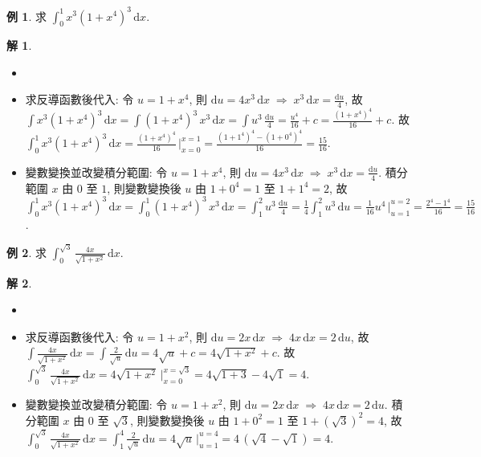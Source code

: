 \documentclass[12pt,a4paper]{extarticle}
\newcommand{\ds}{\displaystyle}
\newcommand{\ie}{\;\Longrightarrow\;}
\theoremstyle{definition}
\newtheorem*{ex}{例}
\newtheorem*{sol}{解}
\begin{document}
\begin{ex}
  求 $\ds\int_0^1 x^3(1 + x^4)^3\,\text{d}x$. 
\end{ex}

\begin{sol}
  \begin{itemize}\setlength{\itemsep}{0pt}
    \item[]
    \item 求反導函數後代入: 令 $\ds u = 1 + x^4$, 則 $\ds\text{d}u = 4 x^3\,\text{d}x\ie x^3\,\text{d}x = \frac{\text{d}u}{4}$, 故 $\ds\int x^3(1 + x^4)^3\,\text{d}x = \int (1 + x^4)^3\,x^3\,\text{d}x = \int u^3\,\frac{\text{d}u}{4} = \frac{u^4}{16} + c = \frac{(1 + x^4)^4}{16} + c$. 故 $\ds\int_0^1 x^3(1 + x^4)^3\,\text{d}x = \frac{(1 + x^4)^4}{16}\,\Big|_{x = 0}^{x = 1} = \frac{(1 + 1^4)^4 - (1 + 0^4)^4}{16} = \frac{15}{16}$. 
    \item 變數變換並改變積分範圍: 令 $\ds u = 1 + x^4$, 則 $\ds\text{d}u = 4 x^3\,\text{d}x\ie x^3\,\text{d}x = \frac{\text{d}u}{4}$. 積分範圍 $x$ 由 $0$ 至 $1$, 則變數變換後 $u$ 由 $\ds 1 + 0^4 = 1$ 至 $\ds1 + 1^4 = 2$, 故 $\ds\int_0^1 x^3(1 + x^4)^3\,\text{d}x = \int_0^1 (1 + x^4)^3\,x^3\,\text{d}x = \int_1^2 u^3\,\frac{\text{d}u}{4} = \frac{1}{4}\int_1^2 u^3\,\text{d}u = \frac{1}{16} u^4\,\Big|_{u = 1}^{u = 2} = \frac{2^4 - 1^4}{16} = \frac{15}{16}$. 
  \end{itemize}
\end{sol}

\begin{ex}
  求 $\ds\int_0^{\sqrt{3}}\frac{4x}{\sqrt{1 + x^2}}\,\text{d}x$. 
\end{ex}

\begin{sol}
  \begin{itemize}\setlength{\itemsep}{0pt}
    \item[]
    \item 求反導函數後代入: 令 $\ds u = 1 + x^2$, 則 $\ds\text{d}u = 2 x\,\text{d}x\ie 4x\,\text{d}x = 2\,\text{d}u$, 故 $\ds\int\!\frac{4x}{\sqrt{1 + x^2}}\,\text{d}x = \int\!\frac{2}{\sqrt{u}}\,\text{d}u = 4\sqrt{u} + c = 4\sqrt{1 + x^2} + c$. 故 $\ds\int_0^{\sqrt{3}}\frac{4x}{\sqrt{1 + x^2}}\,\text{d}x = 4\sqrt{1 + x^2}\,\Big|_{x = 0}^{x = \sqrt{3}} = 4\sqrt{1 + 3} - 4\sqrt{1} = 4$. 
    \item 變數變換並改變積分範圍: 令 $\ds u = 1 + x^2$, 則 $\ds\text{d}u = 2 x\,\text{d}x\ie 4x\,\text{d}x = 2\,\text{d}u$. 積分範圍 $x$ 由 $0$ 至 $\sqrt{3}$, 則變數變換後 $u$ 由 $\ds1 + 0^2 = 1$ 至 $\ds1 + (\sqrt{3})^2 = 4$, 故 $\ds\int_0^{\sqrt{3}}\frac{4x}{\sqrt{1 + x^2}}\,\text{d}x = \int_1^4 \frac{2}{\sqrt{u}}\,\text{d}u = 4\sqrt{u}\,\Big|_{u = 1}^{u = 4} = 4\,(\sqrt{4} - \sqrt{1}) = 4$. 
  \end{itemize}
\end{sol}
\end{document}
